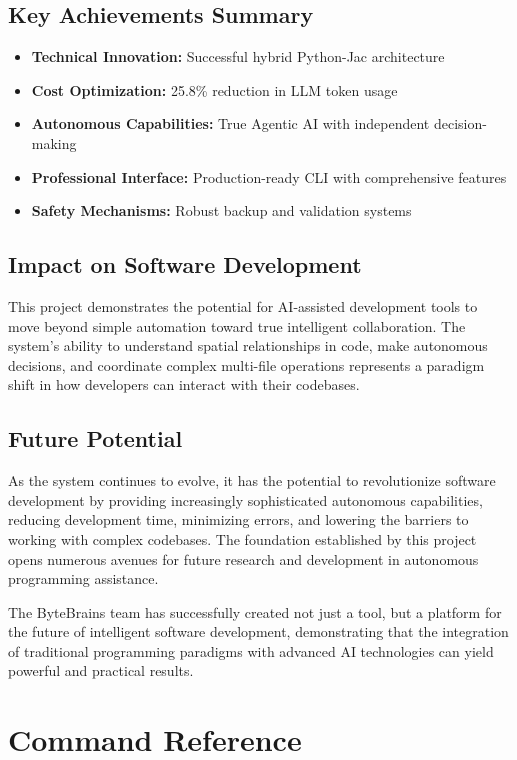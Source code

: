 \documentclass[12pt,a4paper]{article}
\begin{document}
\subsection{Key Achievements Summary}
\begin{itemize}
    \item \textbf{Technical Innovation:} Successful hybrid Python-Jac architecture
    \item \textbf{Cost Optimization:} 25.8\% reduction in LLM token usage
    \item \textbf{Autonomous Capabilities:} True Agentic AI with independent decision-making
    \item \textbf{Professional Interface:} Production-ready CLI with comprehensive features
    \item \textbf{Safety Mechanisms:} Robust backup and validation systems
\end{itemize}

\subsection{Impact on Software Development}
This project demonstrates the potential for AI-assisted development tools to move beyond simple automation toward true intelligent collaboration. The system's ability to understand spatial relationships in code, make autonomous decisions, and coordinate complex multi-file operations represents a paradigm shift in how developers can interact with their codebases.

\subsection{Future Potential}
As the system continues to evolve, it has the potential to revolutionize software development by providing increasingly sophisticated autonomous capabilities, reducing development time, minimizing errors, and lowering the barriers to working with complex codebases. The foundation established by this project opens numerous avenues for future research and development in autonomous programming assistance.

The ByteBrains team has successfully created not just a tool, but a platform for the future of intelligent software development, demonstrating that the integration of traditional programming paradigms with advanced AI technologies can yield powerful and practical results.

\appendix

\section{Command Reference}
\end{document}
